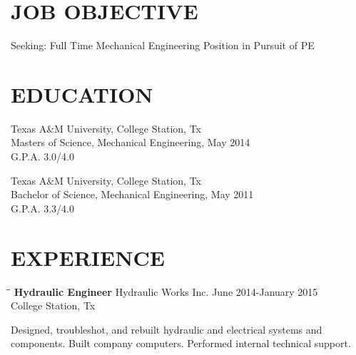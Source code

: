 \documentclass{res}
\begin{document}
 

\address{\bf  PRESENT ADDRESS\\2306 Carnation Ct.\\College Station, Tx 77840\\(806) 486-1918}
\address{\bf PERMANENT ADDRESS \\ 12451 Co Rd D 1/2\\Pampa, Tx 79065\\(806) 886-7213}
                                  
\begin{resume}

\section{JOB OBJECTIVE}          
Seeking: Full Time Mechanical Engineering Position in Pursuit of PE
 
\section{EDUCATION}  
	Texas A\&M University, College Station, Tx \\
	Masters of Science, Mechanical Engineering, May 2014 \\
	G.P.A. 3.0/4.0

	Texas A\&M University, College Station, Tx \\
	Bachelor of Science, Mechanical Engineering, May 2011 \\
	G.P.A. 3.3/4.0
 
\section{EXPERIENCE}
   \vspace{-0.1in}	
   \begin{tabbing}
   \hspace{2.5in}\= \hspace{2.6in}\= \kill %
    {\bf Hydraulic Engineer} \>Hydraulic Works Inc.     \>June 2014-January 2015\\
    \>College Station, Tx
   \end{tabbing}\vspace{-20pt}      %
   Designed, troubleshot, and rebuilt hydraulic and electrical systems and components. Built company computers. Performed internal technical support.


\end{resume}
\end{document}
